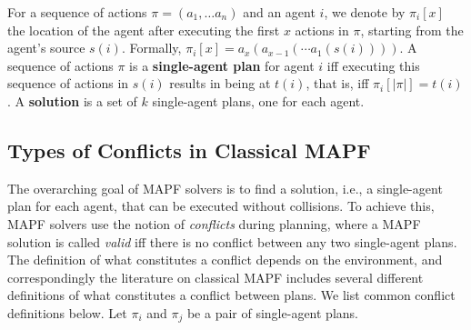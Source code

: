 \documentclass[letterpaper]{article} %
\newcommand{\comment}[1]{{\nb{\textbf{Comment:}}{orange}{#1}}}
\begin{document}
For a sequence of actions $\pi=(a_1,\ldots a_n)$
and an agent $i$,
we denote by $\pi_i[x]$
the location of the agent after executing  the first $x$ actions in $\pi$, starting from the agent's source $s(i)$.
Formally, $\pi_i[x]=a_x(a_{x-1}(\cdots a_1(s(i))))$.
A sequence of actions $\pi$ is a \textbf{single-agent plan} for agent $i$ iff executing this sequence of actions in $s(i)$ results in being at $t(i)$,
that is, iff $\pi_i[|\pi|]=t(i)$.
A \textbf{solution} is a set of $k$ single-agent plans, one for each agent.


\subsection{Types of Conflicts in Classical MAPF}

The overarching goal of MAPF solvers is to find a solution, i.e., a single-agent plan for each agent, that can be executed without collisions. To achieve this, MAPF solvers use the notion of \emph{conflicts} during planning, where a MAPF solution is called \emph{valid} iff there is no conflict between any two single-agent plans. The definition of what constitutes a conflict depends on the environment, and correspondingly the literature on classical MAPF includes several different definitions of what constitutes a conflict between plans. We list common conflict definitions below. Let $\pi_i$ and $\pi_j$ be a pair of single-agent plans.

\end{document}
